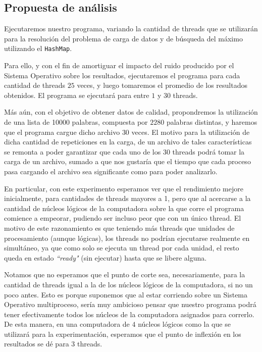 \documentclass[a4paper]{article}
\begin{document}
\subsection{Propuesta de análisis}\label{hipotesis}

Ejecutaremos nuestro programa, variando la cantidad de threads que se utilizarán para la resolución del problema de carga de datos y de búsqueda del máximo utilizando el \texttt{HashMap}.

Para ello, y con el fin de amortiguar el impacto del ruido producido por el Sistema Operativo sobre los resultados, ejecutaremos el programa para cada cantidad de threads $25$ veces, y luego tomaremos el promedio de los resultados obtenidos. El programa se ejecutará para entre $1$ y $30$ threads.

Más aún, con el objetivo de obtener datos de calidad, propondremos la utilización de una lista de 10000 palabras, compuesta por $2280$ palabras distintas, y haremos que el programa cargue dicho archivo $30$ veces. El motivo para la utilización de dicha cantidad de repeticiones en la carga, de un archivo de tales características se remonta a poder garantizar que cada uno de los 30 threads podrá tomar la carga de un archivo, sumado a que nos gustaría que el tiempo que cada proceso pasa cargando el archivo sea significante como para poder analizarlo.

En particular, con este experimento esperamos ver que el rendimiento mejore inicialmente, para cantidades de threads mayores a 1, pero que al acercarse a la cantidad de núcleos lógicos de la computadora sobre la que corre el programa comience a empeorar, pudiendo ser incluso peor que con un único thread. El motivo de este razonamiento es que teniendo más threads que unidades de procesamiento (aunque lógicas), los threads no podrían ejecutarse realmente en simultáneo, ya que como solo se ejecuta un thread por cada unidad, el resto queda en estado \textit{``ready"} (sin ejecutar) hasta que se libere alguna.

Notamos que no esperamos que el punto de corte sea, necesariamente, para la cantidad de threads igual a la de los núcleos lógicos de la computadora, si no un poco antes. Esto es porque suponemos que al estar corriendo sobre un Sistema Operativo multiproceso, sería muy ambicioso pensar que nuestro programa podrá tener efectivamente todos los núcleos de la computadora asignados para correrlo. De esta manera, en una computadora de $4$ núcleos lógicos como la que se utilizará para la experimentación, esperamos que el punto de inflexión en los resultados se dé para $3$ threads.
\end{document}
